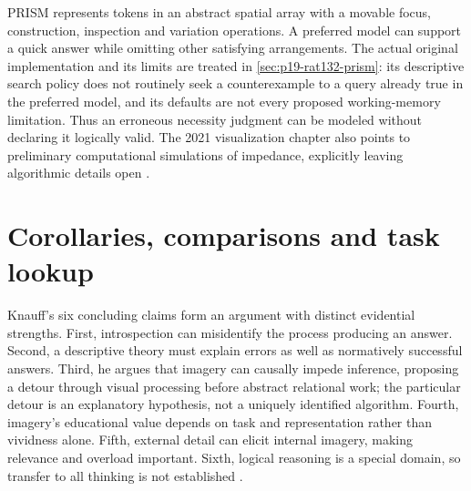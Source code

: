 PRISM represents tokens in an abstract spatial array with a movable focus,
construction, inspection and variation operations. A preferred model can
support a quick answer while omitting other satisfying arrangements.
The actual original implementation and its limits are treated in
\cref{sec:p19-rat132-prism}: its descriptive search policy does not routinely
seek a counterexample to a query already true in the preferred model, and
its defaults are not every proposed working-memory limitation.
Thus an erroneous necessity judgment can be modeled without declaring it
logically valid. The 2021 visualization chapter also points to preliminary
computational simulations of impedance, explicitly leaving algorithmic
details open \parencite[pp.~740--741]{Knauff2021VisualizationRationality}.

\section{Corollaries, comparisons and task lookup}
\label{sec:p19-rat133-lookup}

Knauff's six concluding claims form an argument with distinct evidential
strengths. First, introspection can misidentify the process producing an
answer. Second, a descriptive theory must explain errors as well as
normatively successful answers. Third, he argues that imagery can causally
impede inference, proposing a detour through visual processing before
abstract relational work; the particular detour is an explanatory hypothesis,
not a uniquely identified algorithm. Fourth, imagery's educational value
depends on task and representation rather than vividness alone. Fifth,
external detail can elicit internal imagery, making relevance and overload
important. Sixth, logical reasoning is a special domain, so transfer to all
thinking is not established \parencite[p.~741]{Knauff2021VisualizationRationality}.

